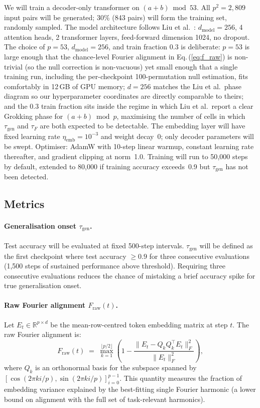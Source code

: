 \documentclass[12pt,openany,a4paper]{book}
\newcommand{\eq}[1]  {Eq.\,(\ref{#1})}
\newcommand{\taug}{\tau_{\mathrm{gen}}}
\newcommand{\tauf}{\tau_{F}}
\begin{document}
We will train a decoder-only transformer \cite{vaswani2017attention}
on $(a+b)\bmod 53$.
All $p^2 = 2{,}809$ input pairs will be generated; 30\% (843 pairs)
will form the training set, randomly sampled.
The model architecture follows Liu et al.\ \cite{liu2022towards}:
$d_{\mathrm{model}}=256$, 4 attention heads, 2 transformer layers,
feed-forward dimension 1024, no dropout.
The choice of $p=53$, $d_{\mathrm{model}}=256$, and train fraction
$0.3$ is deliberate: $p=53$ is large enough that the chance-level
Fourier alignment in \eq{eq:f_raw} is non-trivial (so the null
correction is non-vacuous) yet small enough that a single training
run, including the per-checkpoint 100-permutation null estimation,
fits comfortably in 12\,GB of GPU memory; $d=256$ matches the
Liu et al.\ phase diagram so our hyperparameter coordinates are
directly comparable to theirs; and the $0.3$ train fraction sits
inside the regime in which Liu et al.\ report a clear Grokking phase
for $(a+b)\bmod p$, maximising the number of cells in which $\taug$
and $\tauf$ are both expected to be detectable.
The embedding layer will have fixed learning rate $\eta_{\mathrm{emb}}
= 10^{-3}$ and weight decay~0; only decoder parameters will be swept.
Optimiser: AdamW with 10-step linear warmup, constant learning rate
thereafter, and gradient clipping at norm~1.0.
Training will run to 50{,}000 steps by default, extended to 80{,}000
if training accuracy exceeds~0.9 but $\taug$ has not been detected.

\subsection{Metrics}

\paragraph{Generalisation onset $\taug$.}
Test accuracy will be evaluated at fixed 500-step intervals.
$\taug$ will be defined as the first checkpoint where test accuracy
$\geq 0.9$ for three consecutive evaluations (1{,}500 steps of
sustained performance above threshold).
Requiring three consecutive evaluations reduces the chance of mistaking a brief accuracy spike for true generalisation onset.

\paragraph{Raw Fourier alignment $F_{\mathrm{raw}}(t)$.}
Let $E_t \in \mathbb{R}^{p \times d}$ be the mean-row-centred token
embedding matrix at step $t$.
The raw Fourier alignment is:
\begin{equation}
  F_{\mathrm{raw}}(t) \;=\;
  \max_{k=1}^{\lfloor p/2\rfloor}
  \!\left(1 - \frac{\|E_t - Q_k Q_k^\top E_t\|_F^2}
  {\|E_t\|_F^2}\right),
  \label{eq:f_raw}
\end{equation}
where $Q_k$ is an orthonormal basis for the subspace spanned by
$[\cos(2\pi k i/p),\sin(2\pi k i/p)]_{i=0}^{p-1}$.
This quantity measures the fraction of embedding variance explained
by the best-fitting single Fourier harmonic (a lower bound on
alignment with the full set of task-relevant harmonics).
\end{document}
